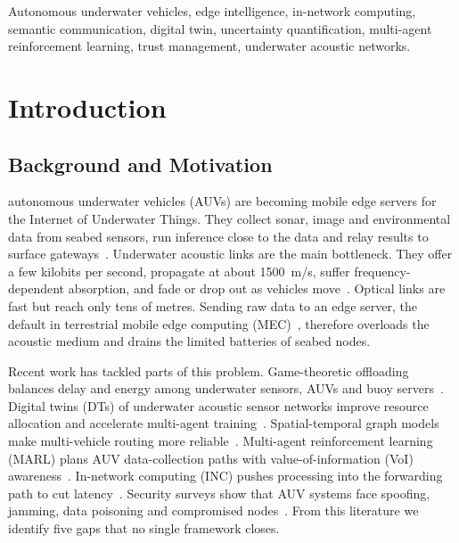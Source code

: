 \documentclass[lettersize,journal]{IEEEtran}
\begin{document}
\begin{IEEEkeywords}
Autonomous underwater vehicles, edge intelligence, in-network computing, semantic communication, digital twin, uncertainty quantification, multi-agent reinforcement learning, trust management, underwater acoustic networks.
\end{IEEEkeywords}

\section{Introduction}
\subsection{Background and Motivation}
 autonomous underwater vehicles (AUVs) are becoming mobile edge servers for the Internet of Underwater Things. They collect sonar, image and environmental data from seabed sensors, run inference close to the data and relay results to surface gateways~\cite{yang2021survey,dai2022survey,lin2025madac}. Underwater acoustic links are the main bottleneck. They offer a few kilobits per second, propagate at about 1500~m/s, suffer frequency-dependent absorption, and fade or drop out as vehicles move~\cite{song2025dtna,xu2025stgr,shu2026offload,stojanovic2007capacity}. Optical links are fast but reach only tens of metres. Sending raw data to an edge server, the default in terrestrial mobile edge computing (MEC)~\cite{mao2017mec,pang2020sagin,chen2025ios,su2020maritime}, therefore overloads the acoustic medium and drains the limited batteries of seabed nodes.

Recent work has tackled parts of this problem. Game-theoretic offloading balances delay and energy among underwater sensors, AUVs and buoy servers~\cite{shu2026offload}. Digital twins (DTs) of underwater acoustic sensor networks improve resource allocation and accelerate multi-agent training~\cite{song2025dtna}. Spatial-temporal graph models make multi-vehicle routing more reliable~\cite{xu2025stgr}. Multi-agent reinforcement learning (MARL) plans AUV data-collection paths with value-of-information (VoI) awareness~\cite{lin2025madac}. In-network computing (INC) pushes processing into the forwarding path to cut latency~\cite{wu2024inc,hong2024cnc}. Security surveys show that AUV systems face spoofing, jamming, data poisoning and compromised nodes~\cite{ahmad2026survey}. From this literature we identify five gaps that no single framework closes.
\end{document}
